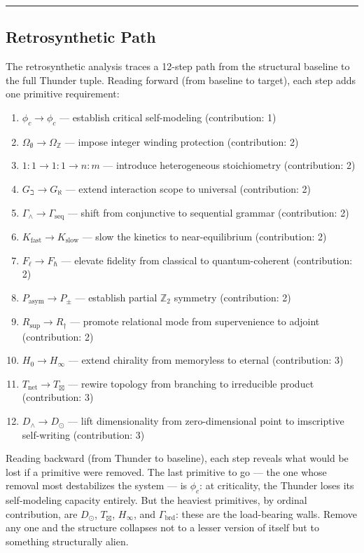 \documentclass[12pt,a4paper]{article}
\begin{document}
\begin{center}
\rule{0.5\textwidth}{0.4pt}
\end{center}

\subsection{Retrosynthetic Path}

The retrosynthetic analysis traces a 12-step path from the structural baseline to the full Thunder tuple. Reading forward (from baseline to target), each step adds one primitive requirement:

\begin{enumerate}
    \item $\phi_c \to \phi_c$ --- establish critical self-modeling (contribution: 1)
    \item $\Omega_{\emptyset} \to \Omega_\mathbb{Z}$ --- impose integer winding protection (contribution: 2)
    \item $1{:}1 \to1{:}1 \to n{:}m$ --- introduce heterogeneous stoichiometry (contribution: 2)
    \item $G_{\beth} \to G_{\aleph}$ --- extend interaction scope to universal (contribution: 2)
    \item $\Gamma_{\wedge} \to \Gamma_\text{seq}$ --- shift from conjunctive to sequential grammar (contribution: 2)
    \item $K_\text{fast} \to K_\text{slow}$ --- slow the kinetics to near-equilibrium (contribution: 2)
    \item $F_{\ell} \to F_{\hbar}$ --- elevate fidelity from classical to quantum-coherent (contribution: 2)
    \item $P_\text{asym} \to P_{\pm}$ --- establish partial $\mathbb{Z}_2$ symmetry (contribution: 2)
    \item $R_\text{sup} \to R_{\dagger}$ --- promote relational mode from supervenience to adjoint (contribution: 2)
    \item $H_0 \to H_{\infty}$ --- extend chirality from memoryless to eternal (contribution: 3)
    \item $T_\text{net} \to T_{\boxtimes}$ --- rewire topology from branching to irreducible product (contribution: 3)
    \item $D_{\wedge} \to D_{\odot}$ --- lift dimensionality from zero-dimensional point to imscriptive self-writing (contribution: 3)
\end{enumerate}

Reading backward (from Thunder to baseline), each step reveals what would be lost if a primitive were removed. The last primitive to go --- the one whose removal most destabilizes the system --- is $\phi_c$: at criticality, the Thunder loses its self-modeling capacity entirely. But the heaviest primitives, by ordinal contribution, are $D_{\odot}$, $T_{\boxtimes}$, $H_{\infty}$, and $\Gamma_\text{brd}$: these are the load-bearing walls. Remove any one and the structure collapses not to a lesser version of itself but to something structurally alien.
\end{document}
